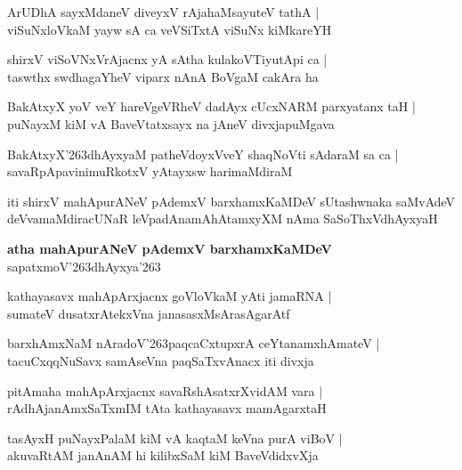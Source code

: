\begin{shloka}
ArUDhA sayxMdaneV diveyxV rAjahaMsayuteV tathA |\\
viSuNxloVkaM yayw sA ca veVSiTxtA viSuNx kiMkareYH
\end{shloka}

\begin{shloka}
shirxV viSoVNxVrAjacnx yA sAtha kulakoVTiyutApi ca |\\
taswthx swdhagaYheV viparx nAnA BoVgaM cakAra ha
\end{shloka}

\begin{shloka}
BakAtxyX yoV veY hareVgeVRheV dadAyx cUcxNARM parxyatanx taH |\\
puNayxM kiM vA BaveVtatxsayx na jAneV divxjapuMgava
\end{shloka}

\begin{shloka}
BakAtxyX\char'263dhAyxyaM patheVdoyxVveY shaqNoVti sAdaraM sa ca |\\
savaRpApavinimuRkotxV yAtayxsw harimaMdiraM
\end{shloka}
iti shirxV mahApurANeV pAdemxV barxhamxKaMDeV sUtashwnaka saMvAdeV deVvamaMdiracUNaR leVpadAnamAhAtamxyXM nAma SaSoThxVdhAyxyaH

\begin{center}
\textbf{\large atha mahApurANeV pAdemxV barxhamxKaMDeV}\\
sapatxmoV\char'263dhAyxya\char'263
\end{center}

\setcounter{shloka}{0}
\begin{shloka}
kathayasavx mahApArxjacnx goVloVkaM yAti jamaRNA |\\
sumateV dusatxrAtekxVna janasasxMsArasAgarAtf
\end{shloka}

\begin{shloka}
barxhAmxNaM nAradoV\char'263paqcaCxtupxrA ceYtanamxhAmateV |\\
tacuCxqqNuSavx samAseVna paqSaTxvAnacx iti divxja
\end{shloka}

\begin{shloka}
pitAmaha mahApArxjacnx savaRshAsatxrXvidAM vara |\\
rAdhAjanAmxSaTxmIM tAta kathayasavx mamAgarxtaH
\end{shloka}

\begin{shloka}
tasAyxH puNayxPalaM kiM vA kaqtaM keVna purA viBoV |\\
akuvaRtAM janAnAM hi kilibxSaM kiM BaveVdidxvXja
\end{shloka}

